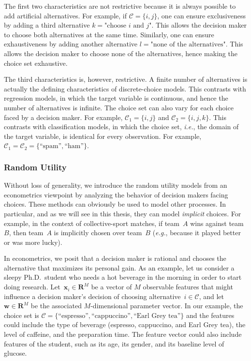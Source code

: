 The first two characteristics are not restrictive because it is always possible to add artificial alternatives.
For example, if $\mathcal{C} = \{i, j\}$, one can ensure exclusiveness by adding a third alternative $k = \text{"choose $i$ and $j$"}$.
This allows the decision maker to choose both alternatives at the same time.
Similarly, one can ensure exhaustiveness by adding another alternative $l = \text{"none of the alternatives"}$.
This allows the decision maker to choose none of the alternatives, hence making the choice set exhaustive.

The third characteristics is, however, restrictive.
A finite number of alternatives is actually the defining characteristics of discrete-choice models.
This contrasts with regression models, in which the target variable is continuous, and hence the number of alternatives is infinite.
The choice set can also vary for each choice faced by a decision maker.
For example, $\mathcal{C}_1 = \{ i, j \}$ and $\mathcal{C}_2 = \{ i, j, k \}$.
This contrasts with classification models, in which the choice set, \textit{i.e.}, the domain of the target variable, is identical for every observation.
For example, $\mathcal{C}_1 = \mathcal{C}_2 = \{ \text{``spam''}, \text{``ham''} \}$.

\subsubsection{Random Utility}

Without loss of generality, we introduce the random utility models from an econometrics viewpoint by analyzing the behavior of decision makers facing choices.
These methods can obviously be used to model other processes.
In particular, and as we will see in this thesis, they can model \emph{implicit} choices.
For example, in the context of collective-sport matches, if team~$A$ wins against team~$B$, then team~$A$ is implicitly chosen over team~$B$ (\textit{e.g.}, because it played better or was more lucky).

In econometrics, we posit that a decision maker is rational and chooses the alternative that maximizes its personal gain.
As an example, let us consider a sleepy Ph.D.\ student who needs a hot beverage in the morning in order to start doing research.
Let~$\bm{x}_i \in \mathbf{R}^M$ be a vector of $M$ observable features that might influence a decision maker's decision of choosing alternative~$i \in \mathcal{C}$, and let $\bm{w}\in \mathbf{R}^M$ be the associated $M$-dimensional parameter vector.
In our example, the choice set is $\mathcal{C} = \{ \text{``espresso''}, \text{``cappuccino''}, \text{``Earl Grey tea''}  \}$ and the features could include the type of beverage (espresso, cappuccino, and Earl Grey tea), the level of caffeine, and the preparation time.
The feature vector could also include features of the student, such as its age, its gender, and its baseline level of glucose.

